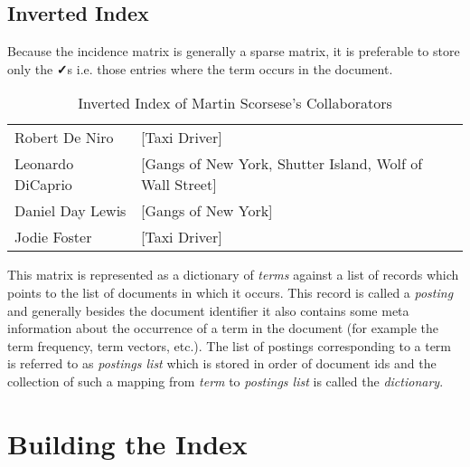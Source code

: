 \subsection{Inverted Index}
Because the incidence matrix is generally a sparse matrix, it is preferable to store only the \textbf{✓}s
i.e. those entries where the term occurs in the document.
\begin{table}[ht]
  \caption{Inverted Index of Martin Scorsese's Collaborators}
  \centering
  \begin{tabular}{p{4cm}p{7cm}}
    \hline \hline
    Robert De Niro    & [Taxi Driver] \\
    Leonardo DiCaprio & [Gangs of New York, Shutter Island, Wolf of Wall Street] \\
    Daniel Day Lewis  & [Gangs of New York] \\
    Jodie Foster      & [Taxi Driver] \\
  \end{tabular}
\end{table}

This matrix is represented as a dictionary of \textit{terms} against a list of records which points to the list of documents in which it occurs.
This record is called a \textit{posting} and generally besides the document identifier it also contains some meta information about the
occurrence of a term in the document (for example the term frequency, term vectors, etc.).
The list of postings corresponding to a term is referred to as \textit{postings list} which is stored in order of document ids
and the collection of such a mapping from \textit{term} to \textit{postings list} is called the \textit{dictionary}.

\section{Building the Index}

